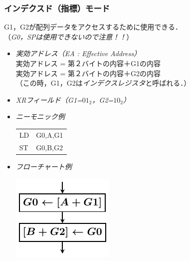 \documentclass[handout]{beamer}        %
\begin{document}
\begin{frame}
  \frametitle{インデクスド（指標）モード}
  G1，G2が配列データをアクセスするために使用できる．\\
  （\emph{G0，SPは使用できないので注意！！}）
  \vfill
  \begin{itemize}
  \item \emph{実効アドレス（EA : Effective Address）} \\
    実効アドレス = 第２バイトの内容＋G1の内容 \\
    実効アドレス = 第２バイトの内容＋G2の内容 \\
    （この時，G1，G2は\emph{インデクスレジスタ}と呼ばれる．）
    \vfill
  \item \emph{XRフィールド（G1=$01_2$，G2=$10_2$）}
    \vfill
  \item \emph{ニーモニック例} \\
    {\ttfamily\vspace{-0.5cm}\begin{center}
      \begin{tabular}{l l}
        LD & G0,A,G1 \\
        ST & G0,B,G2 \\
      \end{tabular}
    \end{center}}
    \vfill
  \item \emph{フローチャート例} \\
    \vspace{-0.5cm}\centerline{\includegraphics[scale=0.8]{../Tikz/flowF.pdf}}
  \end{itemize}
  \vfill
  \vfill
\end{frame}
\end{document}
